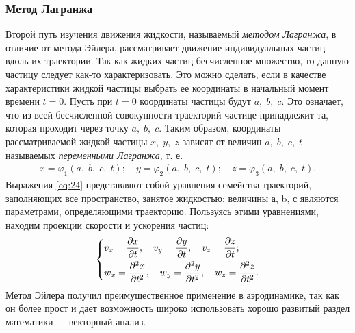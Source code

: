 	\subsubsection{Метод Лагранжа}
	Второй путь изучения движения жидкости, называемый \textit{методом Лагранжа}, в отличие от метода Эйлера, рассматривает движение индивидуальных частиц вдоль их траектории. Так как жидких частиц бесчисленное множество, то данную частицу следует как-то характеризовать. Это можно сделать, если в качестве характеристики жидкой частицы выбрать ее координаты в начальный момент времени $t = 0$. Пусть при $t = 0$ координаты частицы будут $a,\; b,\; c$. Это означает, что из всей бесчисленной совокупности траекторий частице принадлежит та, которая проходит через точку $a,\; b,\; c$. Таким образом, координаты рассматриваемой жидкой частицы $x,\;y,\;z$ зависят от величин $a,\; b,\; c,\; t$ называемых \textit{переменными Лагранжа}, т. е.
	\begin{gather}
		x = \varphi_1(a,\; b,\; c,\; t); \quad y = \varphi_2(a,\; b,\; c,\; t); \quad z = \varphi_3(a,\; b,\; c,\; t).\label{eq:24}
	\end{gather}\n
	Выражения \eqref{eq:24} представляют собой уравнения семейства траекторий, заполняющих все пространство, занятое жидкостью; величины а, b, с являются параметрами, определяющими траекторию. Пользуясь этими уравнениями, находим проекции скорости и ускорения частиц:
	\begin{gather}
		\begin{dcases}
			v_x = \frac{\partial x}{\partial t},\quad v_y = \frac{\partial y}{\partial t},\quad v_z = \frac{\partial z}{\partial t};\\
			w_x = \frac{\partial^2 x}{\partial t^2},\quad w_y = \frac{\partial^2 y}{\partial t^2},\quad w_z = \frac{\partial^2 z}{\partial t^2}.
		\end{dcases}
	\end{gather}\n
	Метод Эйлера получил преимущественное применение в аэродинамике, так как он более прост и дает возможность широко использовать хорошо развитый раздел математики --- векторный анализ.
	
